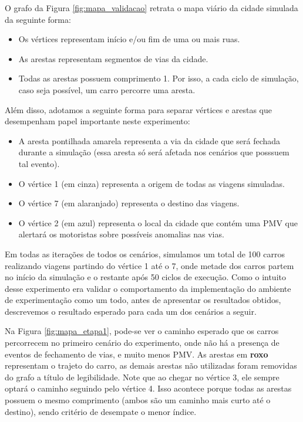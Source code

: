 O grafo da Figura \ref{fig:mapa_validacao} retrata o mapa viário da cidade simulada da seguinte forma:

\begin{itemize}
    \item Os vértices representam início e/ou fim de uma ou mais ruas.

    \item As arestas representam segmentos de vias da cidade.

    \item Todas as arestas possuem comprimento 1. Por isso, a cada ciclo de simulação, caso seja possível, um carro percorre uma aresta.
\end{itemize}

Além disso, adotamos a seguinte forma para separar vértices e arestas que desempenham papel importante neste experimento:

\begin{itemize}
    \item A aresta pontilhada amarela representa a via da cidade que será fechada durante a simulação (essa aresta só será afetada nos cenários que posssuem tal evento).

    \item O vértice 1 (em cinza) representa a origem de todas as viagens simuladas.

    \item O vértice 7 (em alaranjado) representa o destino das viagens.

    \item O vértice 2 (em azul) representa o local da cidade que contém uma PMV que alertará os motoristas sobre possíveis anomalias nas vias.
\end{itemize}

Em todas as iterações de todos os cenários, simulamos um total de 100 carros realizando viagens partindo do vértice 1 até o 7, onde metade dos carros partem no início da simulação e o restante após 50 ciclos
de execução.
Como o intuito desse experimento era validar o comportamento da implementação do ambiente de experimentação como um todo, antes de apresentar os resultados obtidos, descrevemos o resultado esperado para
cada um dos cenários a seguir.

Na Figura \ref{fig:mapa_etapa1}, pode-se ver o caminho esperado que os carros percorrecem no primeiro cenário do experimento, onde não há a presença de eventos de fechamento de vias, e muito menos PMV.
As arestas em \textbf{roxo} representam o trajeto do carro, as demais arestas não utilizadas foram removidas do grafo a título de legibilidade.
Note que ao chegar no vértice 3, ele sempre optará o caminho seguindo pelo vértice 4.
Isso acontece porque todas as arestas possuem o mesmo comprimento (ambos são um caminho mais curto até o destino), sendo critério de desempate o menor índice.

